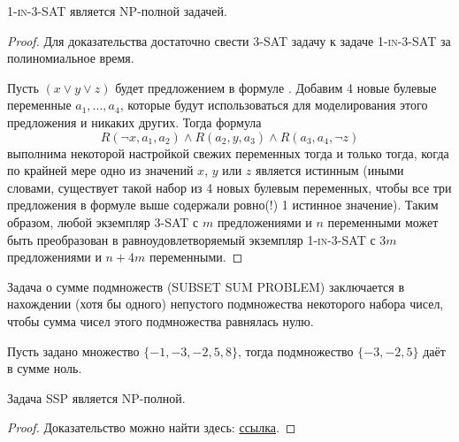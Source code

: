     \begin{Thm}
        \textsc{1-in-3-SAT} является \textsc{NP}-полной задачей.
    \end{Thm}
    \begin{proof}
        Для доказательства достаточно свести \textsc{3-SAT} задачу к задаче \textsc{1-in-3-SAT} за полиномиальное время.

        Пусть $(x \vee y \vee z)$ будет предложением в формуле . 
        Добавим 4 новые булевые переменные $a_1, ..., a_4$, которые будут использоваться для моделирования этого предложения и никаких других. 
        Тогда формула 
        $$R(\neg x,a_1, a_2) \wedge R(a_2, y, a_3) \wedge R(a_3, a_4, \neg z)$$ 
        выполнима некоторой настройкой свежих переменных тогда и только тогда, когда по крайней мере одно из значений $x$, $y$ или $z$ является истинным (иными словами, существует такой набор из 4 новых булевым переменных, чтобы все три предложения в формуле выше содержали ровно(!) 1 истинное значение). 
        Таким образом, любой экземпляр \textsc{3-SAT} с $m$ предложениями и $n$ переменными может быть преобразован в равноудовлетворяемый экземпляр \textsc{1-in-3-SAT} с $3m$ предложениями и $n + 4m$ переменными.
    \end{proof}

    \begin{Def}
        Задача о сумме подмножеств (\textsc{SUBSET SUM PROBLEM}) заключается в нахождении (хотя бы одного) непустого подмножества некоторого набора чисел, чтобы сумма чисел этого подмножества равнялась нулю.
    \end{Def}

    \begin{Example}
        Пусть задано множество $\{-1, -3, -2, 5, 8\}$, тогда подмножество $\{-3, -2, 5\}$ даёт в сумме ноль.
    \end{Example}

    \begin{Thm}
        Задача \textsc{SSP} является \textsc{NP}-полной.
    \end{Thm}

    \begin{proof}
        Доказательство можно найти здесь:
        \href{https://neerc.ifmo.ru/wiki/index.php?title=NP-%D0%BF%D0%BE%D0%BB%D0%BD%D0%BE%D1%82%D0%B0_%D0%B7%D0%B0%D0%B4%D0%B0%D1%87%D0%B8_%D0%BE_%D1%81%D1%83%D0%BC%D0%BC%D0%B5_%D0%BF%D0%BE%D0%B4%D0%BC%D0%BD%D0%BE%D0%B6%D0%B5%D1%81%D1%82%D0%B2%D0%B0}{ссылка}.
    \end{proof}

